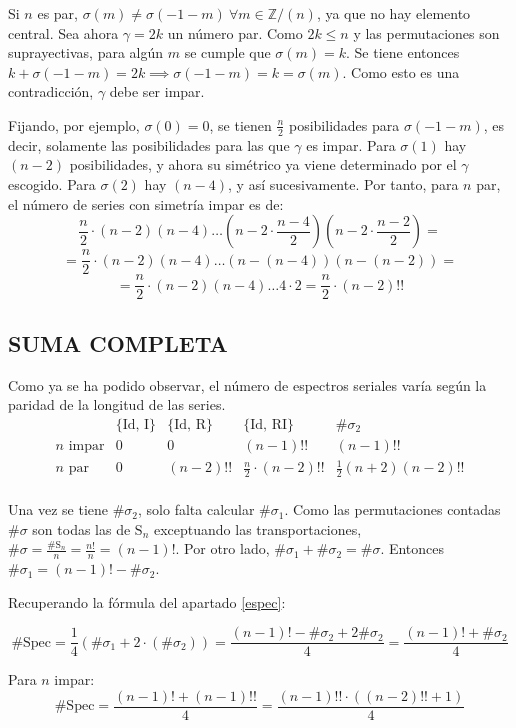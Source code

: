 		Si $n$ es par, $\sigma(m)\neq\sigma(-1-m)\ \forall m\in \mathbb{Z} / (n)$, ya que no hay elemento central. Sea ahora $\gamma=2k$ un número par. Como $2k\leq n$ y las permutaciones son suprayectivas, para algún $m$ se cumple que $\sigma(m)=k$. Se tiene entonces $k+\sigma(-1-m)=2k\implies\sigma(-1-m)=k=\sigma(m)$. Como esto es una contradicción, $\gamma$ debe ser impar.
		
		Fijando, por ejemplo, $\sigma(0)=0$, se tienen $\frac{n}{2}$ posibilidades para $\sigma(-1-m)$, es decir, solamente las posibilidades para las que $\gamma$ es impar. Para $\sigma(1)$ hay $(n-2)$ posibilidades, y ahora su simétrico ya viene determinado por el $\gamma$ escogido. Para $\sigma(2)$ hay $(n-4)$, y así sucesivamente. \cite{reiner} Por tanto, para $n$ par, el número de series con simetría impar es de: 
		$$\frac{n}{2}\cdot(n-2)(n-4)\ldots(n-2\cdot\frac{n-4}{2})(n-2\cdot\frac{n-2}{2})=$$
		$$=\frac{n}{2}\cdot(n-2)(n-4)\ldots(n-(n-4))(n-(n-2))=$$
		$$=\frac{n}{2}\cdot(n-2)(n-4)\ldots4\cdot2=\frac{n}{2}\cdot(n-2)!!$$
			\newpage
	\subsection*{SUMA COMPLETA}
		Como ya se ha podido observar, el número de espectros seriales varía según la paridad de la longitud de las series.		
		\def\arraystretch{1.5}
		$$\begin{array}{c|c|c|c|c}
		&\{\text{Id, I}\}&\{\text{Id, R}\}&\{\text{Id, RI}\}&\#\sigma_2\\\hline
		n\text{ impar}&0&0&(n-1)!!&(n-1)!!\\\hline
		n\text{ par}&0&(n-2)!!&\frac{n}{2}\cdot(n-2)!!&\frac{1}{2}(n+2)(n-2)!!\\
		\end{array}$$
		\def\arraystretch{1}
		
		Una vez se tiene $\#\sigma_2$, solo falta calcular $\#\sigma_1$. Como las permutaciones contadas $\#\sigma$ son todas las de $\text{S}_n$ exceptuando las transportaciones, $\#\sigma=\frac{\#\text{S}_n}{n}=\frac{n!}{n}=(n-1)!$. Por otro lado, $\#\sigma_1 +\#\sigma_2=\#\sigma$. Entonces $\#\sigma_1=(n-1)!-\#\sigma_2$.
		
		Recuperando la fórmula del apartado \ref{espec}:
		
		$$\#\text{Spec}=\frac{1}{4}\left(\#\sigma_1+2\cdot(\#\sigma_2)\right)=\frac{(n-1)!-\#\sigma_2+2\#\sigma_2}{4}=\frac{(n-1)!+\#\sigma_2}{4}$$
		
		Para $n$ impar:
		$$\#\text{Spec}=\frac{(n-1)!+(n-1)!!}{4}=\frac{(n-1)!!\cdot\left((n-2)!!+1\right)}{4}$$
		
